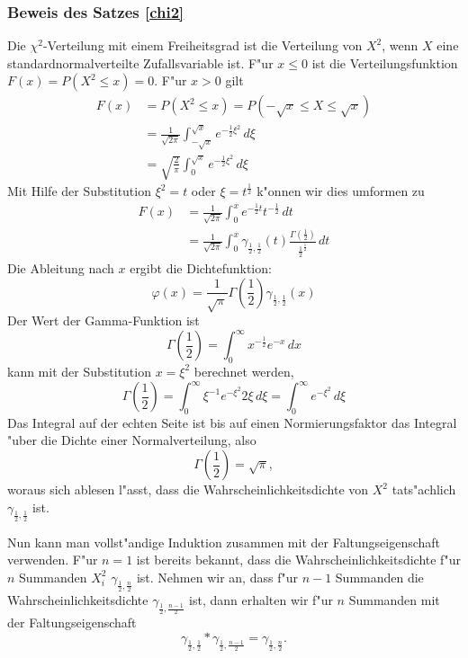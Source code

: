 {\subsubsection{Beweis des Satzes \ref{chi2}}
Die $\chi^2$-Verteilung mit einem Freiheitsgrad ist die Verteilung von
$X^2$, wenn $X$ eine standardnormalverteilte Zufallsvariable ist.
F"ur $x\le 0$ ist die Verteilungsfunktion $F(x)=P(X^2\le x)=0$. 
F"ur $x>0$ gilt
\begin{align*}
F(x)&=P(X^2\le x)=P(-\sqrt{x}\le X\le\sqrt{x})\\
&=\frac1{\sqrt{2\pi}}\int_{-\sqrt{x}}^{\sqrt{x}}e^{-\frac12 \xi^2}\,d\xi\\
&=\sqrt{\frac{2}{\pi}}\int_0^{\sqrt{x}}e^{-\frac12\xi^2}\,d\xi
\end{align*}
Mit Hilfe der Substitution $\xi^2=t$ oder $\xi=t^{\frac12}$ k"onnen wir
dies umformen zu
\begin{align*}
F(x)&=\frac1{\sqrt{2\pi}}\int_0^xe^{-\frac12t}t^{-\frac12}\,dt\\
&=\frac1{\sqrt{2\pi}}\int_0^x\gamma_{\frac12,\frac12}(t)
\frac{\Gamma(\frac12)}{{\frac12}^{\frac12}}\,dt
\end{align*}
Die Ableitung nach $x$ ergibt die Dichtefunktion:
\[
\varphi(x)=\frac1{\sqrt{\pi}}\Gamma({\textstyle\frac12})\gamma_{\frac12,\frac12}(x)
\]
Der Wert der Gamma-Funktion ist
\[
\Gamma({\textstyle\frac12})
=\int_0^\infty x^{-\frac12}e^{-x}\,dx
\]
kann mit der Substitution $x=\xi^2$ berechnet werden,
\[
\Gamma({\textstyle\frac12})=\int_0^\infty \xi^{-1}e^{-\xi^2}2\xi\,d\xi
=\int_0^{\infty}e^{-\xi^2}\,d\xi
\]
Das Integral auf der echten Seite ist bis auf einen Normierungsfaktor
das Integral "uber die Dichte einer Normalverteilung, also
\[
\Gamma({\textstyle\frac12})=\sqrt{\pi},
\]
woraus sich ablesen l"asst, dass die Wahrscheinlichkeitsdichte 
von $X^2$ tats"achlich $\gamma_{\frac12,\frac12}$ ist.

Nun kann man vollst"andige Induktion zusammen mit der Faltungseigenschaft
verwenden.
F"ur $n=1$ ist bereits bekannt, dass die Wahrscheinlichkeitsdichte
f"ur $n$ Summanden $X_i^2$ $\gamma_{\frac12,\frac{n}2}$ ist.
Nehmen wir an,
dass f"ur $n-1$ Summanden die Wahrscheinlichkeitsdichte
$\gamma_{\frac12,\frac{n-1}2}$
ist, dann erhalten wir f"ur $n$ Summanden mit der Faltungseigenschaft
\[
\gamma_{\frac12,\frac12}*\gamma_{\frac12,\frac{n-1}2}=\gamma_{\frac12,\frac{n}2}.
\]

}
